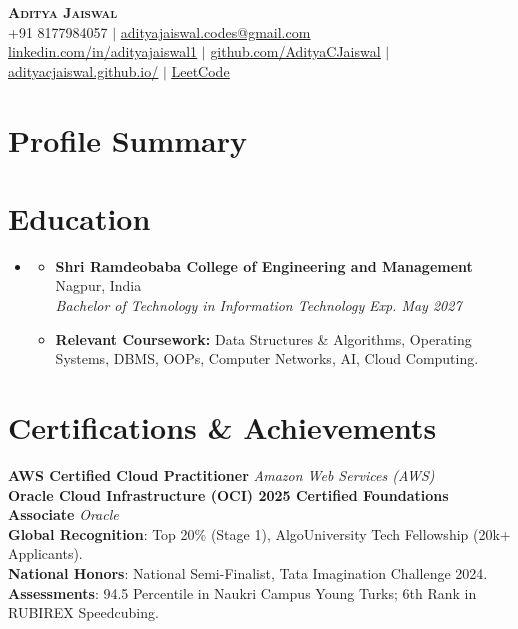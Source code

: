 \documentclass[letterpaper,11pt]{article}
\newcommand{\resumeItem}[1]{
  \item\small{
    {#1 \vspace{-2pt}}
  }
}
\newcommand{\resumeSubheading}[4]{
  \vspace{-1pt}\item
    \begin{itemize}[leftmargin=0in, label={}]
      \item
      \textbf{#1} \hfill #2 \\
      \textit{\small#3} \hfill \textit{\small #4} \\
    \end{itemize}\vspace{-6pt}
}
\newcommand{\resumeSubHeadingListStart}{\begin{itemize}[leftmargin=0.15in, label={}, itemsep=-1pt]}
\newcommand{\resumeSubHeadingListEnd}{\end{itemize}}
\newcommand{\resumeItemListStart}{\begin{itemize}[itemsep=0pt]}
\newcommand{\resumeItemListEnd}{\end{itemize}\vspace{-5pt}}
\begin{document}
\begin{center}
    \textbf{\Huge \scshape Aditya Jaiswal} \\ \vspace{2pt}
    \small +91 8177984057 $|$ \href{mailto:adityajaiswal.codes@gmail.com}{\underline{adityajaiswal.codes@gmail.com}} \\ \vspace{2pt}
    \href{https://www.linkedin.com/in/adityajaiswal1/}{\underline{linkedin.com/in/adityajaiswal1}} $|$
    \href{https://github.com/AdityaCJaiswal}{\underline{github.com/AdityaCJaiswal}} $|$
    \href{https://adityacjaiswal.github.io/}{\underline{adityacjaiswal.github.io/}} $|$
    \href{https://leetcode.com/u/Adityacjaiswal/}{\underline{LeetCode}}
\end{center}


\section{Profile Summary}
 \resumeSubHeadingListStart
   \small{\item{
   }}
 \resumeSubHeadingListEnd


\section{Education}
  \resumeSubHeadingListStart
    \resumeSubheading
      {Shri Ramdeobaba College of Engineering and Management}{Nagpur, India}
      {Bachelor of Technology in Information Technology}{Exp. May 2027}
      \resumeItemListStart
        \resumeItem{\textbf{Relevant Coursework:} Data Structures \& Algorithms, Operating Systems, DBMS, OOPs, Computer Networks, AI, Cloud Computing.}
      \resumeItemListEnd
  \resumeSubHeadingListEnd


\section{Certifications \& Achievements}
 \begin{itemize}[leftmargin=0.15in, label={}]
    \small{\item{
     \textbf{AWS Certified Cloud Practitioner} \hfill \textit{Amazon Web Services (AWS)} \\
     \textbf{Oracle Cloud Infrastructure (OCI) 2025 Certified Foundations Associate} \hfill \textit{Oracle} \\
     
     \textbf{Global Recognition}{: Top 20\% (Stage 1), AlgoUniversity Tech Fellowship (20k+ Applicants).} \\
     \textbf{National Honors}{: National Semi-Finalist, Tata Imagination Challenge 2024.} \\
     \textbf{Assessments}{: 94.5 Percentile in Naukri Campus Young Turks; 6th Rank in RUBIREX Speedcubing.}
    }}
 \end{itemize}
 
\end{document}
